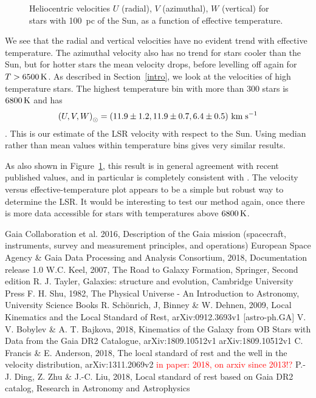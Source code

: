 \documentclass{aastex62}
\begin{document}
	\begin{figure}[ht!]
	\caption{Heliocentric velocities $U$ (radial), $V$ (azimuthal), $W$ (vertical) for stars with 100~pc of the Sun, as a function of effective temperature.\label{fig:lsrmean}}
	\end{figure}

We see that the radial and vertical velocities have no evident trend with effective temperature.  The azimuthal velocity also has no trend for stars cooler than the Sun, but for hotter stars the mean velocity drops, before levelling off again for $T>6500\rm\,K$.  As described in Section~\ref{intro}, we look at the velocities of high temperature stars. The highest temperature bin with more than 300 stars is $6800\rm\,K$ and has
$$ \left( U, V, W\right)_\odot=\left( 11.9\pm1.2, 11.9\pm0.7, 6.4\pm0.5 \right) \rm\,km\;s^{-1} $$.
This is our estimate of the LSR velocity with respect to the Sun.  Using median rather than mean values within temperature bins gives very similar results.

As also shown in Figure~\ref{fig:lsrmean}, this result is in general agreement with recent published values, and in particular is completely consistent with \cite{schoenrich}.  The velocity versus effective-temperature plot appears to be
a simple but robust way to determine the LSR. It would be interesting to test our method again, once there is more data accessible for stars with temperatures above $6800\rm\,K$.


	\begin{thebibliography}{}
		
		 Gaia Collaboration et al. 2016, Description of the Gaia mission (spacecraft, instruments, survey and measurement principles, and operations)
		 European Space Agency \& Gaia Data Processing and Analysis Consortium, 2018, Documentation release 1.0
		W.C. Keel, 2007, The Road to Galaxy Formation, Springer, Second edition
		 R. J. Tayler, Galaxies: structure and evolution, Cambridge University Press
		 F. H. Shu, 1982, The Physical Universe - An Introduction to Astronomy, University Science Books
		 R. Sch\"{o}nrich, J, Binney \& W. Dehnen, 2009, Local Kinematics and the Local Standard of Rest, arXiv:0912.3693v1 [astro-ph.GA]
		 V. V. Bobylev \& A. T. Bajkova, 2018, Kinematics of the Galaxy from OB Stars with Data from the Gaia DR2 Catalogue, arXiv:1809.10512v1 arXiv:1809.10512v1
		 C. Francis \& E. Anderson, 2018, The local standard of rest and the well in the velocity distribution, arXiv:1311.2069v2 \textcolor{red}{in paper: 2018, on arxiv since 2013!?}
		 P.-J. Ding, Z. Zhu \& J.-C. Liu, 2018, Local standard of rest based on Gaia DR2 catalog, Research in Astronomy and Astrophysics
		
	\end{thebibliography}
	
\end{document}
